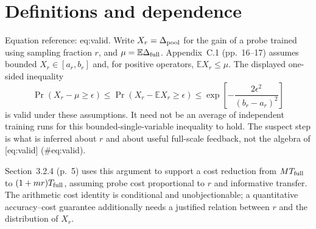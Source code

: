 \documentclass[10pt]{article}
\begin{document}
\section*{Definitions and dependence}
Equation reference: eq:valid. Write \(X_r=\Delta_{\rm pool}\) for the gain of a probe trained using sampling fraction \(r\), and \(\mu=\mathbb E\Delta_{\rm full}\). Appendix C.1 (pp. 16–17) assumes bounded \(X_r\in[a_r,b_r]\) and, for positive operators, \(\mathbb E X_r\leq\mu\). The displayed one-sided inequality \[\Pr(X_r-\mu\geq\epsilon)
 \leq \Pr(X_r-\mathbb EX_r\geq\epsilon)
 \leq \exp\!\left[-\frac{2\epsilon^2}{(b_r-a_r)^2}\right]
 \] is valid under these assumptions. It need not be an average of independent training runs for this bounded-single-variable inequality to hold. The suspect step is what is inferred about \(r\) and about useful full-scale feedback, not the algebra of [eq:valid] (\#eq:valid).\par
Section 3.2.4 (p. 5) uses this argument to support a cost reduction from \(M T_{\rm full}\) to \((1+mr)T_{\rm full}\), assuming probe cost proportional to \(r\) and informative transfer. The arithmetic cost identity is conditional and unobjectionable; a quantitative accuracy–cost guarantee additionally needs a justified relation between \(r\) and the distribution of \(X_r\).\par
\end{document}
